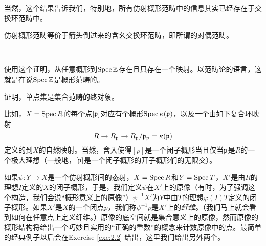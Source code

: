 当然，这个结果告诉我们，特别地，所有仿射概形范畴中的信息其实已经存在于交换环范畴中。

\begin{coro}\label{coro:1.41}
	仿射概形范畴等价于箭头倒过来的含幺交换环范畴，即所谓的对偶范畴。
\end{coro}

\begin{exe}~\label{exe:1.42}
	\begin{compactenum}[(a)]
	\item 使用这个证明，从任意概形到$\operatorname{Spec} \mathbb{Z}$存在且只存在一个映射。以范畴论的语言，这就是在说$\operatorname{Spec} \mathbb{Z}$是概形范畴的。
	\item 证明，单点集是集合范畴的终对象。
	\end{compactenum}
\end{exe}

比如，$X=\operatorname{Spec} R$的每个点$[\mathfrak{p}]$对应有个概形$\operatorname{Spec} \kappa(\mathfrak{p})$，以及一个由如下复合环映射
\[
	R\to R_{\mathfrak{p}}\to R_{\mathfrak{p}}/\mathfrak{p}_{\mathfrak{p}}=\kappa(\mathfrak{p})
\]
定义的到$X$的自然映射。当然，含入使得$[p]$是一个闭子概形当且仅当$\mathfrak{p}$是$R$的一个极大理想（一般地，$[\mathfrak{p}]$是一个闭子概形的开子概形们的无限交）。

如果$\psi:Y\to X$是一个仿射概形间的态射，$X=\operatorname{Spec} R$和$Y=\operatorname{Spec} T$，$X'$是由$R$的理想$I$定义的$X$的闭子概形，于是，我们定义$\psi$在$X'$上的原像（有时，为了强调这个构造，我们会说“概形意义上的原像”）$\psi^{-1}X'$为$Y$中由$T$的理想$\varphi(I)T$定义的闭子概形。如果$X'$是$X$的一个闭点$p$，我们称$\psi^{-1}p$是$X'$上的\textit{纤维}。（我们马上就会看到如何在任意点上定义纤维。）原像的底空间就是集合意义上的原像，然而原像的概形结构将给出一个巧妙且实用的“正确的重数”的概念来计数原像中的点。最简单的经典例子以后会在Exercise \ref{exe:2.2} 给出，这里我们给出另外两个。

